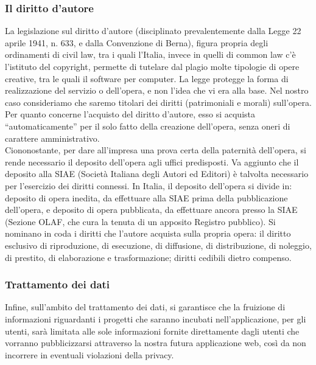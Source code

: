 \subsubsection{Il diritto d'autore}
La legislazione sul diritto d'autore (disciplinato prevalentemente dalla Legge 22 aprile 1941, n. 633, e dalla Convenzione di Berna), figura propria degli ordinamenti di civil law, tra i quali l'Italia, invece in quelli di common law c'è l'istituto del copyright, permette di tutelare dal plagio molte tipologie di opere creative, tra le quali il software per computer. La legge protegge la forma di realizzazione del servizio o dell'opera, e non l'idea che vi era alla base. Nel nostro caso consideriamo che saremo titolari dei diritti (patrimoniali e morali) sull'opera. Per quanto concerne l'acquisto del diritto d'autore, esso si acquista ``automaticamente'' per il solo fatto della creazione dell'opera, senza oneri di carattere amministrativo.\\
Ciononostante, per dare all'impresa una prova certa della paternità dell'opera, si rende necessario il deposito dell'opera agli uffici predisposti. Va aggiunto che il deposito alla SIAE (Società Italiana degli Autori ed Editori) è talvolta necessario per l'esercizio dei diritti connessi. In Italia, il deposito dell'opera si divide in: deposito di opera inedita, da effettuare alla SIAE prima della pubblicazione dell'opera, e deposito di opera pubblicata, da effettuare ancora presso la SIAE (Sezione OLAF, che cura la tenuta di un apposito Registro pubblico). Si nominano in coda i diritti che l'autore acquista sulla propria opera: il diritto esclusivo di riproduzione, di esecuzione, di diffusione, di distribuzione, di noleggio, di prestito, di elaborazione e trasformazione; diritti cedibili dietro compenso.\\

\subsubsection{Trattamento dei dati}
Infine, sull'ambito del trattamento dei dati, si garantisce che la fruizione di informazioni riguardanti i progetti che saranno incubati nell'applicazione, per gli utenti, sarà limitata alle sole informazioni fornite direttamente dagli utenti che vorranno pubblicizzarsi attraverso la nostra futura applicazione web, così da non incorrere in eventuali violazioni della privacy.